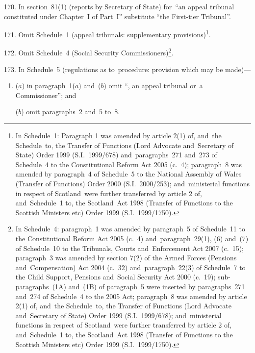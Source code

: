 \documentclass[12pt,a4paper]{article}
\begin{document}
\medskip

170.  In section~81(1) (reports by Secretary of State) for~“an appeal tribunal constituted under Chapter~I of Part~I” substitute “the First-tier Tribunal”.

\medskip

171.  Omit Schedule~1 (appeal tribunals: supplementary provisions)\footnote{In Schedule~1: Paragraph 1 was amended by article 2(1) of, and~the Schedule~to, the Transfer of Functions (Lord Advocate and~Secretary of State) Order 1999 (S.I.~1999/678) and~paragraphs~271 and~273 of Schedule~4 to the Constitutional Reform Act 2005 (c.~4); paragraph~8 was amended by paragraph~4 of Schedule~5 to the National Assembly of Wales (Transfer of Functions) Order 2000 (S.I.~2000/253); and~ministerial functions in respect of Scotland~were further transferred by article 2 of, and~Schedule~1 to, the Scotland~Act 1998 (Transfer of Functions to the Scottish Ministers etc) Order 1999 (S.I.~1999/1750).}.

\medskip

172.  Omit Schedule~4 (Social Security Commissioners)\footnote{In Schedule~4: paragraph~1 was amended by paragraph~5 of Schedule~11 to the Constitutional Reform Act 2005 (c.~4) and~paragraph~29(1), (6) and~(7) of Schedule~10 to the Tribunals, Courts and~Enforcement Act 2007 (c.~15); paragraph~3 was amended by section 7(2) of the Armed Forces (Pensions and~Compensation) Act 2004 (c.~32) and~paragraph~22(3) of Schedule~7 to the Child Support, Pensions and~Social Security Act 2000 (c.~19); sub-paragraphs~(1A) and~(1B) of paragraph~5 were inserted by paragraphs~271 and~274 of Schedule~4 to the 2005 Act; paragraph~8 was amended by article 2(1) of, and~the Schedule~to, the Transfer of Functions (Lord Advocate and~Secretary of State) Order 1999 (S.I.~1999/678); and~ministerial functions in respect of Scotland~were further transferred by article 2 of, and~Schedule~1 to, the Scotland~Act 1998 (Transfer of Functions to the Scottish Ministers etc) Order 1999 (S.I.~1999/1750).}.

\medskip

173.  In Schedule~5 (regulations as to~procedure: provision which may be made)—
\begin{enumerate}\item[]
($a$) in paragraph~1($a$)  and~($b$)  omit “, an appeal tribunal or~a Commissioner”; and

($b$) omit paragraphs~2 and~5 to~8.
\end{enumerate}
\end{document}
